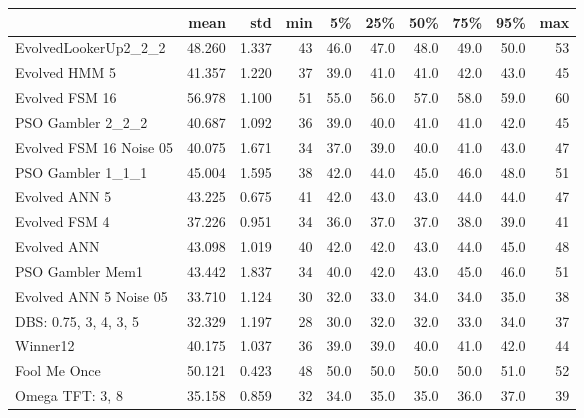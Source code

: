 \begin{tabular}{lrrrrrrrrr}
\toprule
{} &    mean &    std &  min &    5\% &   25\% &   50\% &   75\% &   95\% &  max \\
\midrule
EvolvedLookerUp2\_2\_2    &  48.260 &  1.337 &   43 &  46.0 &  47.0 &  48.0 &  49.0 &  50.0 &   53 \\
Evolved HMM 5           &  41.357 &  1.220 &   37 &  39.0 &  41.0 &  41.0 &  42.0 &  43.0 &   45 \\
Evolved FSM 16          &  56.978 &  1.100 &   51 &  55.0 &  56.0 &  57.0 &  58.0 &  59.0 &   60 \\
PSO Gambler 2\_2\_2       &  40.687 &  1.092 &   36 &  39.0 &  40.0 &  41.0 &  41.0 &  42.0 &   45 \\
Evolved FSM 16 Noise 05 &  40.075 &  1.671 &   34 &  37.0 &  39.0 &  40.0 &  41.0 &  43.0 &   47 \\
PSO Gambler 1\_1\_1       &  45.004 &  1.595 &   38 &  42.0 &  44.0 &  45.0 &  46.0 &  48.0 &   51 \\
Evolved ANN 5           &  43.225 &  0.675 &   41 &  42.0 &  43.0 &  43.0 &  44.0 &  44.0 &   47 \\
Evolved FSM 4           &  37.226 &  0.951 &   34 &  36.0 &  37.0 &  37.0 &  38.0 &  39.0 &   41 \\
Evolved ANN             &  43.098 &  1.019 &   40 &  42.0 &  42.0 &  43.0 &  44.0 &  45.0 &   48 \\
PSO Gambler Mem1        &  43.442 &  1.837 &   34 &  40.0 &  42.0 &  43.0 &  45.0 &  46.0 &   51 \\
Evolved ANN 5 Noise 05  &  33.710 &  1.124 &   30 &  32.0 &  33.0 &  34.0 &  34.0 &  35.0 &   38 \\
DBS: 0.75, 3, 4, 3, 5   &  32.329 &  1.197 &   28 &  30.0 &  32.0 &  32.0 &  33.0 &  34.0 &   37 \\
Winner12                &  40.175 &  1.037 &   36 &  39.0 &  39.0 &  40.0 &  41.0 &  42.0 &   44 \\
Fool Me Once            &  50.121 &  0.423 &   48 &  50.0 &  50.0 &  50.0 &  50.0 &  51.0 &   52 \\
Omega TFT: 3, 8         &  35.158 &  0.859 &   32 &  34.0 &  35.0 &  35.0 &  36.0 &  37.0 &   39 \\
\bottomrule
\end{tabular}
